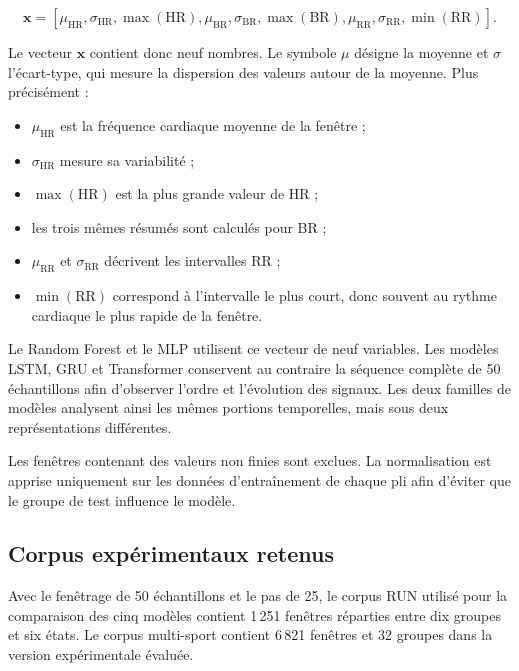 \documentclass[12pt,a4paper]{article}
\newcommand{\HR}{\mathrm{HR}}
\newcommand{\BR}{\mathrm{BR}}
\newcommand{\RR}{\mathrm{RR}}
\begin{document}
\begin{equation}
\mathbf{x}
=
\left[
\mu_{\HR},
\sigma_{\HR},
\max(\HR),
\mu_{\BR},
\sigma_{\BR},
\max(\BR),
\mu_{\RR},
\sigma_{\RR},
\min(\RR)
\right].
\label{eq:features}
\end{equation}

Le vecteur $\mathbf{x}$ contient donc neuf nombres. Le symbole $\mu$ désigne la
moyenne et $\sigma$ l'écart-type, qui mesure la dispersion des valeurs autour
de la moyenne. Plus précisément :

\begin{itemize}[leftmargin=1.5em]
  \item $\mu_{\HR}$ est la fréquence cardiaque moyenne de la fenêtre ;
  \item $\sigma_{\HR}$ mesure sa variabilité ;
  \item $\max(\HR)$ est la plus grande valeur de HR ;
  \item les trois mêmes résumés sont calculés pour BR ;
  \item $\mu_{\RR}$ et $\sigma_{\RR}$ décrivent les intervalles RR ;
  \item $\min(\RR)$ correspond à l'intervalle le plus court, donc souvent au
  rythme cardiaque le plus rapide de la fenêtre.
\end{itemize}

Le Random Forest et le MLP utilisent ce vecteur de neuf variables. Les modèles
LSTM, GRU et Transformer conservent au contraire la séquence complète de
50 échantillons afin d'observer l'ordre et l'évolution des signaux. Les deux
familles de modèles analysent ainsi les mêmes portions temporelles, mais sous
deux représentations différentes.

Les fenêtres contenant des valeurs non finies sont exclues. La normalisation
est apprise uniquement sur les données d'entraînement de chaque pli afin
d'éviter que le groupe de test influence le modèle.

\subsection{Corpus expérimentaux retenus}

Avec le fenêtrage de 50 échantillons et le pas de 25, le corpus RUN utilisé
pour la comparaison des cinq modèles contient 1\,251 fenêtres réparties entre
dix groupes et six états. Le corpus multi-sport contient 6\,821 fenêtres et
32 groupes dans la version expérimentale évaluée.
\end{document}
